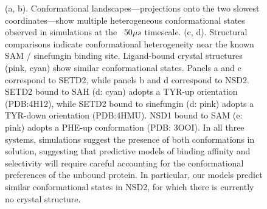 \documentclass[12pt]{article}
\begin{document}
\begin{figure}
\caption{
(a, b).  Conformational landscapes---projections onto the two slowest coordinates---show multiple heterogeneous conformational states observed in simulations at the ~$50 \mu s$ timescale.  (c, d). Structural comparisons indicate conformational heterogeneity near the known SAM / sinefungin binding site.  Ligand-bound crystal structures (pink, cyan) show similar conformational states.  Panels a and c correspond to SETD2, while panels b and d correspond to NSD2.  SETD2 bound to SAH (d: cyan) adopts a TYR-up orientation (PDB:4H12), while SETD2 bound to sinefungin (d: pink) adopts a TYR-down orientation (PDB:4HMU).  NSD1 bound to SAM (e: pink) adopts a PHE-up conformation (PDB: 3OOI).  In all three systems, simulations suggest the presence of both conformations in solution, suggesting that predictive models of binding affinity and selectivity will require careful accounting for the conformational preferences of the unbound protein.  In particular, our models predict similar conformational states in NSD2, for which there is currently no crystal structure.
}
\label{figure:MSM}
\end{figure}
\end{document}
